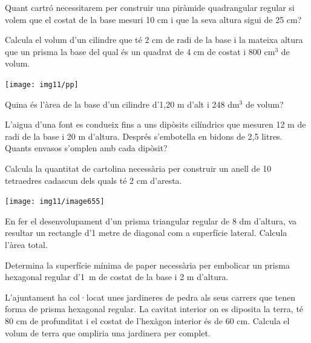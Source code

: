\begin{activitats}
\begin{mylist}
 
\exer  Quant cartró necessitarem per construir una piràmide quadrangular regular si volem que el costat de la base mesuri 10 cm i que la seva altura sigui de 25 cm?


\exer  Calcula el volum d'un cilindre que té 2 cm de radi de la base i la mateixa altura que un prisma la base del qual és un quadrat de 4 cm de costat i 800 cm${}^{3}$ de volum.

\begin{center}
	\texttt{[image: img11/pp]}
\end{center}


\exer  Quina és l'àrea de la base d'un cilindre d'1,20 m d'alt i 248 dm${}^{3}$ de volum?


\exer  L'aigua d'una font es condueix fins a uns dipòsits cilíndrics que mesuren 12 m de radi de la base i 20 m d'altura. Després s'embotella en bidons de 2,5 litres. Quants envasos s'omplen amb cada dipòsit? 


\exer  Calcula la quantitat de cartolina necessària per construir un anell de 10 tetraedres cadascun dels quals té 2 cm d'aresta. 
\begin{center}
	\texttt{[image: img11/image655]}
\end{center}


\exer En fer el desenvolupament d'un prisma triangular regular de 8 dm d'altura, va resultar un rectangle d'1 metre de diagonal com a superfície lateral. Calcula l'àrea total.


\exer  Determina la superfície mínima de paper necessària per embolicar un prisma hexagonal regular d'1~m de costat de la base i 2 m d'altura.



\exer  L'ajuntament ha col·locat unes jardineres de pedra als seus carrers que tenen forma de prisma hexagonal regular. La cavitat interior on es diposita la terra, té 80 cm de profunditat i el costat de l'hexàgon interior és de 60 cm. Calcula el volum de terra que ompliria una jardinera per complet.


\end{mylist}
\end{activitats}
